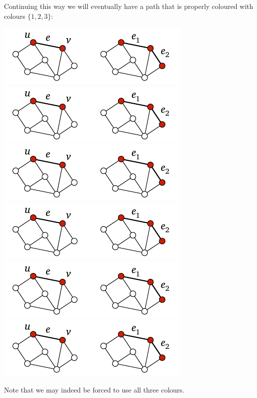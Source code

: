 Continuing this way we will eventually have a path that is properly coloured with colours $\{1,2,3\}$:
\begin{center}
    \includegraphics[page=\PIntroIdC]{figs.pdf}\\
    \includegraphics[page=\PIntroIdCC]{figs.pdf}\\
    \includegraphics[page=\PIntroIdD]{figs.pdf}\\
    \includegraphics[page=\PIntroIdDD]{figs.pdf}\\
    \includegraphics[page=\PIntroIdE]{figs.pdf}\\
    \includegraphics[page=\PIntroIdEE]{figs.pdf}
\end{center}
Note that we may indeed be forced to use all three colours.

